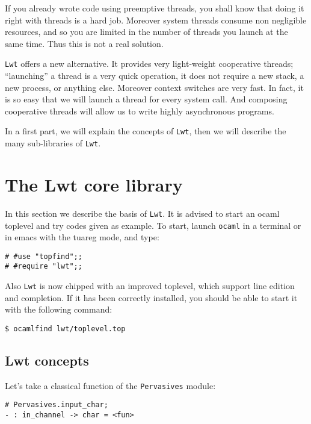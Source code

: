 \documentclass{article}
\newcommand{\lwt}{\texttt{Lwt}\xspace}
\begin{document}
If you already wrote code using preemptive threads, you shall know
that doing it right with threads is a hard job. Moreover system
threads consume non negligible resources, and so you are limited in
the number of threads you launch at the same time. Thus this is not a
real solution.

\lwt offers a new alternative. It provides very light-weight
cooperative threads; ``launching'' a thread is a very quick operation,
it does not require a new stack, a new process, or anything
else. Moreover context switches are very fast. In fact, it is so easy
that we will launch a thread for every system call. And composing
cooperative threads will allow us to write highly asynchronous
programs.

In a first part, we will explain the concepts of \lwt, then we will
describe the many sub-libraries of \lwt.

\section{The Lwt core library}

In this section we describe the basis of \lwt. It is advised to start
an ocaml toplevel and try codes given as example. To start, launch
\texttt{ocaml} in a terminal or in emacs with the tuareg mode, and
type:

\begin{verbatim}
# #use "topfind";;
# #require "lwt";;
\end{verbatim}

Also \lwt is now chipped with an improved toplevel, which support line
edition and completion. If it has been correctly installed, you should
be able to start it with the following command:

\begin{verbatim}
$ ocamlfind lwt/toplevel.top
\end{verbatim}

\subsection{Lwt concepts}

Let's take a classical function of the \texttt{Pervasives} module:

\begin{verbatim}
# Pervasives.input_char;
- : in_channel -> char = <fun>
\end{verbatim}
\end{document}
